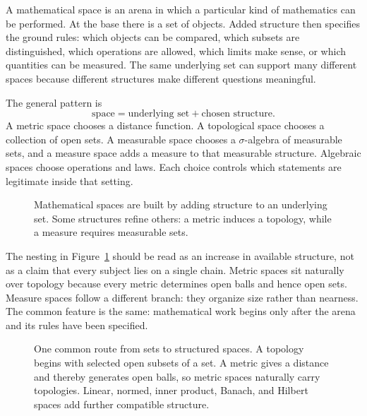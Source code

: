 \begin{remark*}[Exposition]
A mathematical space is an arena in which a particular kind of mathematics can
be performed.  At the base there is a set of objects.  Added structure then
specifies the ground rules: which objects can be compared, which subsets are
distinguished, which operations are allowed, which limits make sense, or which
quantities can be measured.  The same underlying set can support many different
spaces because different structures make different questions meaningful.
\end{remark*}

\begin{remark*}
The general pattern is
\[
  \text{space} = \text{underlying set} + \text{chosen structure}.
\]
A metric space chooses a distance function.  A topological space chooses a
collection of open sets.  A measurable space chooses a $\sigma$-algebra of
measurable sets, and a measure space adds a measure to that measurable
structure.  Algebraic spaces choose operations and laws.  Each choice controls
which statements are legitimate inside that setting.
\end{remark*}

\begin{figure}[htbp]
\centering

\caption{Mathematical spaces are built by adding structure to an underlying
set.  Some structures refine others: a metric induces a topology, while a
measure requires measurable sets.}
\label{fig:nested-mathematical-spaces}
\end{figure}

\begin{remark*}[Interpretation]
The nesting in Figure~\ref{fig:nested-mathematical-spaces} should be read as
an increase in available structure, not as a claim that every subject lies on a
single chain.  Metric spaces sit naturally over topology because every metric
determines open balls and hence open sets.  Measure spaces follow a different
branch: they organize size rather than nearness.  The common feature is the
same: mathematical work begins only after the arena and its rules have been
specified.
\end{remark*}

\begin{figure}[htbp]
\centering

\caption{One common route from sets to structured spaces.  A topology begins
with selected open subsets of a set.  A metric gives a distance and thereby
generates open balls, so metric spaces naturally carry topologies.  Linear,
normed, inner product, Banach, and Hilbert spaces add further compatible
structure.}
\label{fig:sets-to-spaces-hierarchy}
\end{figure}

